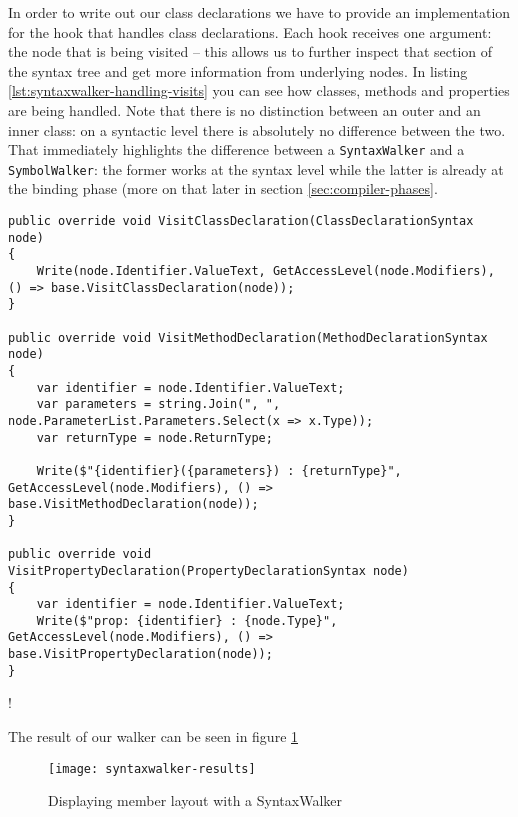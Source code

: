 In order to write out our class declarations we have to provide an implementation for the hook that handles class declarations. Each hook receives one argument: the node that is being visited -- this allows us to further inspect that section of the syntax tree and get more information from underlying nodes. In listing \ref{lst:syntaxwalker-handling-visits} you can see how classes, methods and properties are being handled. Note that there is no distinction between an outer and an inner class: on a syntactic level there is absolutely no difference between the two. That immediately highlights the difference between a \texttt{SyntaxWalker} and a \texttt{SymbolWalker}: the former works at the syntax level while the latter is already at the binding phase (more on that later in section \ref{sec:compiler-phases}.

\begin{lstlisting}[label={lst:syntaxwalker-handling-visits}]
public override void VisitClassDeclaration(ClassDeclarationSyntax node)
{
    Write(node.Identifier.ValueText, GetAccessLevel(node.Modifiers), () => base.VisitClassDeclaration(node));
}

public override void VisitMethodDeclaration(MethodDeclarationSyntax node)
{
	var identifier = node.Identifier.ValueText;
	var parameters = string.Join(", ", node.ParameterList.Parameters.Select(x => x.Type));
	var returnType = node.ReturnType;

	Write($"{identifier}({parameters}) : {returnType}", GetAccessLevel(node.Modifiers), () => base.VisitMethodDeclaration(node));
}

public override void VisitPropertyDeclaration(PropertyDeclarationSyntax node)
{
	var identifier = node.Identifier.ValueText;
	Write($"prop: {identifier} : {node.Type}", GetAccessLevel(node.Modifiers), () => base.VisitPropertyDeclaration(node));
}
\end{lstlisting}
\ifx{\verb+$$+}!\fi %


\noindent The result of our walker can be seen in figure \ref{syntaxwalker-results}

\begin{figure}[H]
\centering
\texttt{[image: syntaxwalker-results]}
\caption[Displaying member layout with a SyntaxWalker]{Displaying member layout with a SyntaxWalker}
\label{syntaxwalker-results}
\end{figure}


